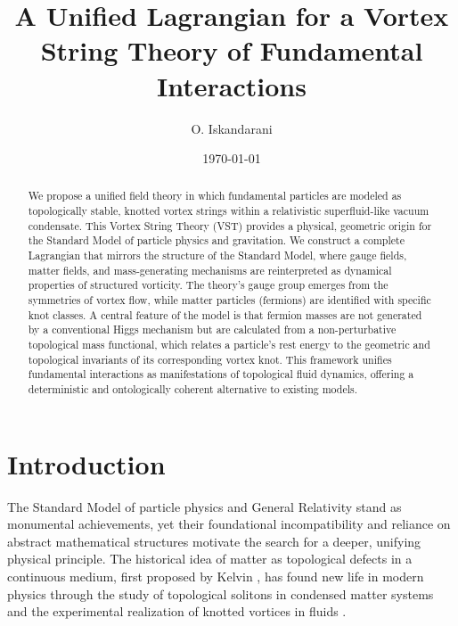 \documentclass[12pt, a4paper]{article}
\title{A Unified Lagrangian for a Vortex String Theory of Fundamental Interactions}
\author{O. Iskandarani}
\affil{Independent Researcher, Groningen, The Netherlands}
\date{\today}
\begin{document}
    \maketitle
    \thispagestyle{fancy}
    \pagestyle{fancy}
    \fancyhf{}
    \cfoot{\thepage}
    \renewcommand{\headrulewidth}{0pt}

    \begin{abstract}
        \noindent We propose a unified field theory in which fundamental particles are modeled as topologically stable, knotted vortex strings within a relativistic superfluid-like vacuum condensate. This Vortex String Theory (VST) provides a physical, geometric origin for the Standard Model of particle physics and gravitation. We construct a complete Lagrangian that mirrors the structure of the Standard Model, where gauge fields, matter fields, and mass-generating mechanisms are reinterpreted as dynamical properties of structured vorticity. The theory's gauge group emerges from the symmetries of vortex flow, while matter particles (fermions) are identified with specific knot classes. A central feature of the model is that fermion masses are not generated by a conventional Higgs mechanism but are calculated from a non-perturbative topological mass functional, which relates a particle's rest energy to the geometric and topological invariants of its corresponding vortex knot. This framework unifies fundamental interactions as manifestations of topological fluid dynamics, offering a deterministic and ontologically coherent alternative to existing models.
    \end{abstract}

    \newpage

    \section{Introduction}

    The Standard Model of particle physics and General Relativity stand as monumental achievements, yet their foundational incompatibility and reliance on abstract mathematical structures motivate the search for a deeper, unifying physical principle. The historical idea of matter as topological defects in a continuous medium, first proposed by Kelvin \cite{Kelvin1867}, has found new life in modern physics through the study of topological solitons in condensed matter systems \cite{Volovik2003} and the experimental realization of knotted vortices in fluids \cite{Kleckner2013}.
\end{document}
